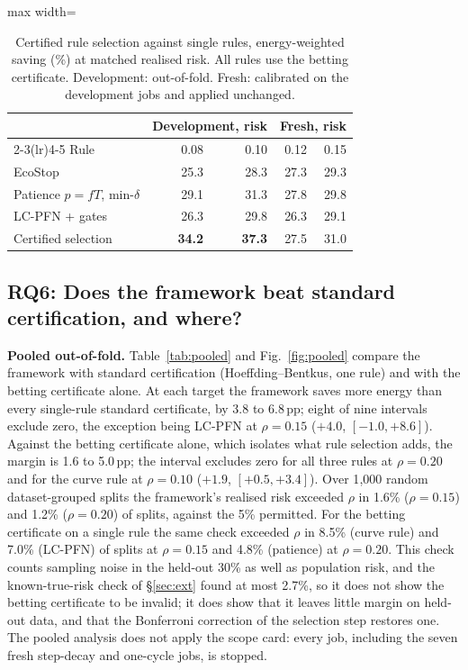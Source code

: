 \documentclass[3p,twocolumn,10pt]{elsarticle}
\theoremstyle{definition}
\begin{document}
\begin{table}[t]
\centering
\caption{Certified rule selection against single rules, energy-weighted saving (\%) at matched realised risk. All rules use the betting certificate. Development: out-of-fold. Fresh: calibrated on the development jobs and applied unchanged.}
\label{tab:portfolio}
\footnotesize
\begin{adjustbox}{max width=\columnwidth}
\begin{tabular}{p{2.8cm}rrrr}
\toprule
 & \multicolumn{2}{c}{Development, risk} & \multicolumn{2}{c}{Fresh, risk} \\
\cmidrule(lr){2-3}\cmidrule(lr){4-5}
Rule & 0.08 & 0.10 & 0.12 & 0.15 \\
\midrule
EcoStop & 25.3 & 28.3 & 27.3 & 29.3 \\
Patience $p{=}fT$, min-$\delta$ & 29.1 & 31.3 & 27.8 & 29.8 \\
LC-PFN + gates & 26.3 & 29.8 & 26.3 & 29.1 \\
Certified selection & \textbf{34.2} & \textbf{37.3} & 27.5 & 31.0 \\
\bottomrule
\end{tabular}
\end{adjustbox}
\end{table}

\subsection{RQ6: Does the framework beat standard certification, and where?}
\label{sec:regime}
\textbf{Pooled out-of-fold.} Table~\ref{tab:pooled} and Fig.~\ref{fig:pooled} compare the framework with standard certification (Hoeffding--Bentkus, one rule) and with the betting certificate alone. At each target the framework saves more energy than every single-rule standard certificate, by 3.8 to 6.8\,pp; eight of nine intervals exclude zero, the exception being LC-PFN at $\rho=0.15$ ($+4.0$, $[-1.0,+8.6]$). Against the betting certificate alone, which isolates what rule selection adds, the margin is 1.6 to 5.0\,pp; the interval excludes zero for all three rules at $\rho=0.20$ and for the curve rule at $\rho=0.10$ ($+1.9$, $[+0.5,+3.4]$). Over 1{,}000 random dataset-grouped splits the framework's realised risk exceeded $\rho$ in 1.6\% ($\rho=0.15$) and 1.2\% ($\rho=0.20$) of splits, against the 5\% permitted. For the betting certificate on a single rule the same check exceeded $\rho$ in 8.5\% (curve rule) and 7.0\% (LC-PFN) of splits at $\rho=0.15$ and 4.8\% (patience) at $\rho=0.20$. This check counts sampling noise in the held-out 30\% as well as population risk, and the known-true-risk check of \S\ref{sec:ext} found at most 2.7\%, so it does not show the betting certificate to be invalid; it does show that it leaves little margin on held-out data, and that the Bonferroni correction of the selection step restores one. The pooled analysis does not apply the scope card: every job, including the seven fresh step-decay and one-cycle jobs, is stopped.
\end{document}
